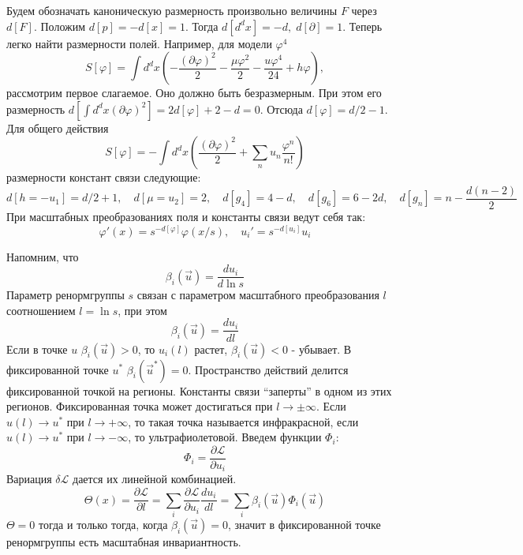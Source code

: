 \documentclass[a4paper,12pt]{article}
\theoremstyle{definition}
\theoremstyle{definition}
\theoremstyle{definition}
\begin{document}
Будем обозначать каноническую размерность произвольно величины $F$ через $d[F]$.
Положим $d[p]=-d[x]=1$. Тогда $d[d^d x]=-d,\; d[\partial]=1$. Теперь легко найти размерности полей. Например, для модели $\varphi^4$
\begin{equation}
  \label{eq:83}
  S[\varphi]=\int d^d x\left( -\frac{(\partial \varphi)^2}{2}-\frac{\mu \varphi^2}{2}-\frac{u\varphi^4}{24}+h\varphi\right),
\end{equation}
рассмотрим первое слагаемое. Оно должно быть безразмерным. При этом его размерность $d[\int d^d x (\partial \varphi)^2]=2d[\varphi]+2-d=0$. Отсюда $d[\varphi]=d/2-1$. Для общего действия
\begin{equation}
  \label{eq:84}
  S[\varphi]=-\int d^d x\left( \frac{(\partial \varphi)^2}{2}+\sum_n u_n \frac{\varphi^n}{n!}\right)
\end{equation}
размерности констант связи следующие:
\begin{equation}
  \label{eq:85}
  d[h=-u_1]=d/2+1,\quad d[\mu=u_2]=2,\quad d[g_4]=4-d,\quad d[g_6]=6-2d,\quad d[g_n]=n-\frac{d(n-2)}{2}
\end{equation}
При масштабных преобразованиях поля и константы связи ведут себя так:
\begin{equation}
  \label{eq:86}
  \varphi'(x)=s^{-d[\varphi]}\varphi(x/s),\quad u_i'=s^{-d[u_i]}u_i
\end{equation}

Напомним, что
\begin{equation}
  \label{eq:76}
  \beta_{i}(\vec u)=\frac{du_i}{d\ln s}
\end{equation}
Параметр ренормгруппы $s$ связан с параметром масштабного преобразования $l$ соотношением $l=\ln s$, при этом
\begin{equation}
  \label{eq:79}
   \beta_{i}(\vec u)=\frac{du_i}{dl}
\end{equation}
Если в точке $u$ $\beta_i(\vec u)>0$, то $u_i(l)$ растет, $\beta_i (\vec u)<0$ - убывает. В фиксированной точке $u^*$ $\beta_i(\vec u^*)=0$. Пространство действий делится фиксированной точкой на регионы. Константы связи ``заперты'' в одном из этих регионов. Фиксированная точка может достигаться при $l\to \pm \infty$. Если $u(l)\to u^*$ при $l\to +\infty$, то такая точка называется инфракрасной, если $u(l)\to u^*$ при $l\to -\infty$, то ультрафиолетовой. Введем функции $\Phi_i$:
\begin{equation}
  \label{eq:77}
  \Phi_i=\frac{\partial \mathcal{L}}{\partial u_i}
\end{equation}
Вариация $\delta \mathcal{L}$ дается их линейной комбинацией.
\begin{equation}
  \label{eq:78}
  \Theta(x)=\frac{\partial \mathcal{L}}{\partial l}=\sum_i \frac{\partial \mathcal{L}}{\partial u_i}\frac{d u_i}{dl}=\sum_i\beta_i(\vec u)\Phi_i(\vec u)
\end{equation}
$\Theta=0$ тогда и только тогда, когда $\beta_i(\vec u)=0$, значит в фиксированной точке ренормгруппы есть масштабная инвариантность.
\end{document}
